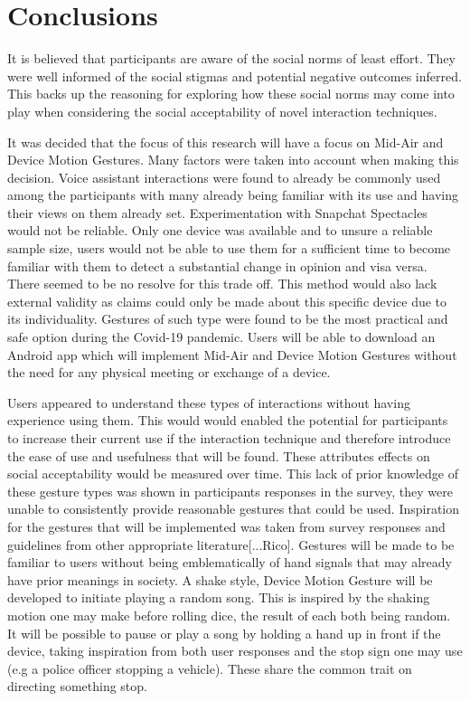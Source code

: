 \documentclass{l4proj}
\begin{document}
\section{Conclusions}

It is believed that participants are  aware of the social norms of least effort. They were well informed of the social stigmas and potential negative outcomes inferred. This backs up the reasoning for exploring how these social norms may come into play when considering the social acceptability of novel interaction techniques.

It was decided that the focus of this research will have a focus on Mid-Air and Device Motion Gestures. Many factors were taken into account when making this decision. Voice assistant interactions were found to already be commonly used among the participants with many already being familiar with its use and having their views on them already set. Experimentation with  Snapchat Spectacles would not be reliable. Only one device was available and to unsure a reliable sample size, users would not be able to use them for a sufficient time to become familiar with them to detect a substantial change in opinion and visa versa. There seemed to be no resolve for this trade off. This method would also lack external validity as claims could only be made about this specific device due to its individuality. Gestures of such type were found to be the most practical and safe option during the Covid-19 pandemic. Users will be able to download an Android app which will implement Mid-Air and Device Motion Gestures without the need for any physical meeting or exchange of a device. 

Users appeared to understand these types of interactions without having experience using them. This would would enabled the potential for participants to increase their current use if the interaction technique and therefore introduce the ease of use and usefulness that will be found. These attributes effects on social acceptability would be measured over time. This lack of prior knowledge of these gesture types was shown in participants responses in the survey, they were unable to consistently provide reasonable gestures that could be used. Inspiration for the gestures that will be implemented was taken from survey responses and guidelines from other appropriate literature[...Rico]. Gestures will be made to be familiar to users without being emblematically of hand signals that may already have prior meanings in society. A shake style, Device Motion Gesture will be developed to initiate playing a random song. This is inspired by the shaking motion one may make before rolling dice, the result of each both being random. It will be possible to pause or play a song by holding a hand up in front if the device, taking inspiration from both user responses and the stop sign one may use (e.g a police officer stopping a vehicle). These share the common trait on directing something stop.
\end{document}
